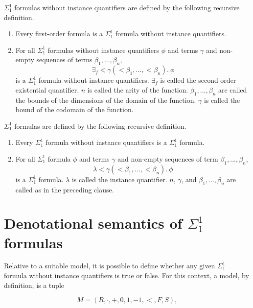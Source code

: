 \documentclass[11pt]{article}
\begin{document}
$\Sigma^1_1$ formulas without instance quantifiers are defined by the following recursive definition.

\begin{enumerate}
	\item Every first-order formula is a $\Sigma^1_1$ formula without instance quantifiers.
	\item For all $\Sigma^1_1$ formulas without instance quantifiers $\phi$ and terms $\gamma$ and non-empty sequences of terms $\beta_1, ..., \beta_n$,
		\begin{equation}
			\exists_f <\gamma (<\beta_1, ..., <\beta_n).\ \phi
		\end{equation}
		is a $\Sigma^1_1$ formula without instance quantifiers. $\exists_f$ is called the second-order existential quantifier. $n$ is called the arity of the function. $\beta_1, ..., \beta_n$ are called the bounds of the dimensions of the domain of the function. $\gamma$ is called the bound of the codomain of the function.
\end{enumerate}

$\Sigma^1_1$ formulas are defined by the following recursive definition.

\begin{enumerate}
	\item Every $\Sigma^1_1$ formula without instance quantifiers is a $\Sigma^1_1$ formula.
	\item For all $\Sigma^1_1$ formula $\phi$ and terms $\gamma$ and non-empty sequences of term $\beta_1, ..., \beta_n$,
		\begin{equation}
			\lambda <\gamma (<\beta_1, ..., <\beta_n).\ \phi
		\end{equation}
		is a $\Sigma^1_1$ formula. $\lambda$ is called the instance quantifier. $n$, $\gamma$, and $\beta_1, ..., \beta_n$ are called as in the preceding clause.
\end{enumerate}


\section{Denotational semantics of $\Sigma^1_1$ formulas}
\label{sec:sigma11-denotations}

Relative to a suitable model, it is possible to define whether any given
$\Sigma^1_1$ formula without instance quantifiers is true or false.
For this context, a model, by definition, is a tuple

\begin{equation}
	M = (R, \cdot, +, 0, 1, -1, <, F, S),
\end{equation}
\end{document}
